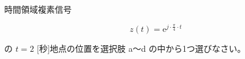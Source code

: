 時間領域複素信号 

\[
z(t) = \textrm{e}^{ j \cdot \frac{\pi}{4} \cdot t }
\]

\medskip
\noindent の $t = 2$ [秒]地点の位置を選択肢 a〜d の中から1つ選びなさい。
